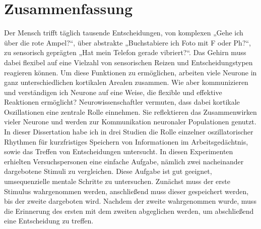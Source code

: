 
\chapter*{Zusammenfassung}
\doublespacing
Der Mensch trifft täglich tausende Entscheidungen, von komplexen „Gehe ich über die rote Ampel?“, über abstrakte „Buchstabiere ich Foto mit F oder Ph?“, zu sensorisch geprägten „Hat mein Telefon gerade vibriert?“. Das Gehirn muss dabei flexibel auf eine Vielzahl von sensorischen Reizen und Entscheidungstypen reagieren können. Um diese Funktionen zu ermöglichen, arbeiten viele Neurone in ganz unterschiedlichen kortikalen Arealen zusammen. Wie aber kommunizieren und verständigen ich Neurone auf eine Weise, die flexible und effektive Reaktionen ermöglicht? Neurowissenschaftler vermuten, dass dabei kortikale Oszillationen eine zentrale Rolle einnehmen. Sie reflektieren das Zusammenwirken vieler Neurone und werden zur Kommunikation neuronaler Populationen genutzt. In dieser Dissertation habe ich in drei Studien die Rolle einzelner oszillatorischer Rhythmen für kurzfristiges Speichern von Informationen im Arbeitsgedächtnis, sowie das Treffen von Entscheidungen untersucht. In diesen Experimenten erhielten Versuchspersonen eine einfache Aufgabe, nämlich zwei nacheinander dargebotene Stimuli zu vergleichen. Diese Aufgabe ist gut geeignet, umsequenzielle mentale Schritte zu untersuchen. Zunächst muss der erste Stimulus wahrgenommen werden, anschließend muss dieser gespeichert werden, bis der zweite dargeboten wird. Nachdem der zweite wahrgenommen wurde, muss die Erinnerung des ersten mit dem zweiten abgeglichen werden, um abschließend eine Entscheidung zu treffen.


